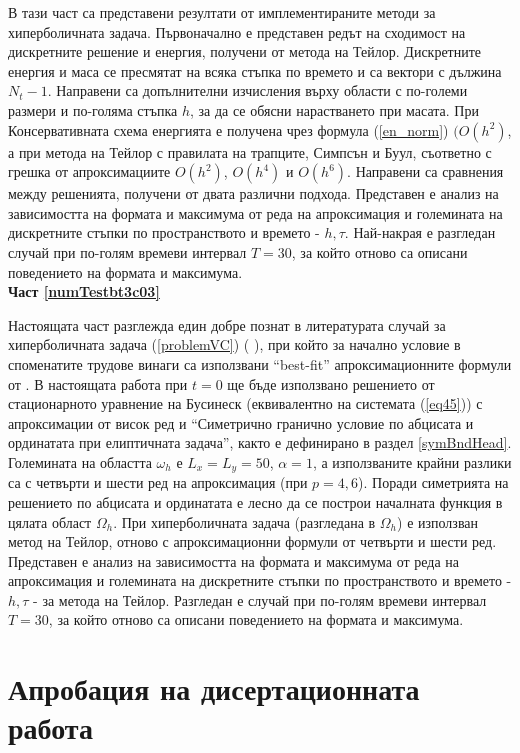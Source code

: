 \documentclass[a5paper]{article}
\newcommand{\rf}[1]{(\ref{#1})}
\theoremstyle{remark}
\begin{document}
\begin{normalsize}
В тази част са представени резултати от имплементираните методи за хиперболичната задача.
Първоначално е представен редът на сходимост на дискретните решение и енергия, получени от метода на Тейлор. Дискретните енергия и маса се пресмятат на всяка стъпка по времето и са вектори с дължина $N_t - 1$. Направени са допълнителни изчисления върху области с по-големи размери и по-голяма стъпка $h$, за да се обясни нарастването при масата. При Консервативната схема енергията е получена чрез формула \rf{en_norm} $(O(h^{2})$, а при метода на Тейлор с правилата на трапците, Симпсън и Буул, съответно с грешка от апроксимациите $O(h^{2})$, $O(h^{4})$ и $O(h^{6})$. Направени са сравнения между решенията, получени от двата различни подхода. Представен е анализ на зависимостта на формата и максимума от реда на апроксимация и големината на дискретните стъпки по пространството и времето - $h, \tau$.  Най-накрая е разгледан случай при по-голям времеви интервал $T=30$, за който отново са описани поведението на формата и максимума.\\

\textbf{Част \ref{numTestbt3c03}}

Настоящата част разглежда един добре познат в литературата случай за хиперболичната задача \rf{problemVC} ( \cite{ref21, ref20, ref23, ref22} ), при който за начално условие в споменатите трудове винаги са използвани ``best-fit'' апроксимационните формули от \cite{ref15}. В настоящата работа при $t=0$ ще бъде използвано решението от стационарното уравнение на Бусинеск (еквивалентно на системата \rf{eq45}) с апроксимации от висок ред и  ``Симетрично гранично условие по абцисата и ординатата при елиптичната задача'', както е дефинирано в раздел \ref{symBndHead}. Големината на областта $\omega_h$ е $L_x = L_y = 50$, $\alpha = 1$, а използваните крайни разлики са с четвърти и шести ред на апроксимация (при $p=4, 6$). Поради симетрията на решението по абцисата и ординатата е лесно да се построи началната функция в цялата област $\Omega_h$. При хиперболичната задача (разгледана в $\Omega_h$) е използван метод на Тейлор, отново с апроксимационни формули от четвърти и шести ред. Представен е анализ на зависимостта на формата и максимума от реда на апроксимация и големината на дискретните стъпки по пространството и времето - $h, \tau$ - за метода на Тейлор. Разгледан е случай при по-голям времеви интервал $T=30$, за който отново са описани поведението на формата и максимума.\\

\section{Апробация на дисертационната работа}\label{approb}


\end{normalsize}
\end{document}

